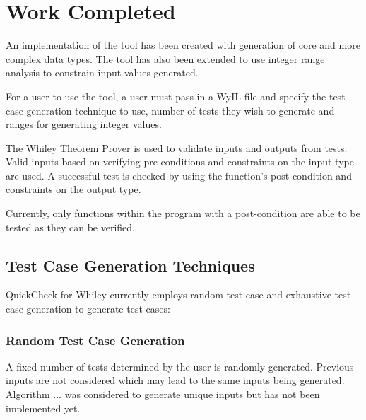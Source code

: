 \chapter{Work Completed}\label{chapter:work}



An implementation of the tool has been created with generation of core and more complex data types. The tool has also been extended to use integer range analysis to constrain input values generated.

For a user to use the tool, a user must pass in a WyIL file and specify the test case generation technique to use, number of tests they wish to generate and ranges for generating integer values.

The Whiley Theorem Prover is used to validate inputs and outputs from tests. Valid inputs based on verifying pre-conditions and constraints on the input type are used. A successful test is checked by using the function's post-condition and constraints on the output type.

Currently, only functions within the program with a post-condition are able to be tested as they can be verified.

\section{Test Case Generation Techniques}

QuickCheck for Whiley currently employs random test-case and exhaustive test case generation to generate test cases: 

\subsection{Random Test Case Generation}

A fixed number of tests determined by the user is randomly generated. Previous inputs are not considered which may lead to the same inputs being generated. 
Algorithm ... was considered to generate unique inputs but has not been implemented yet.

